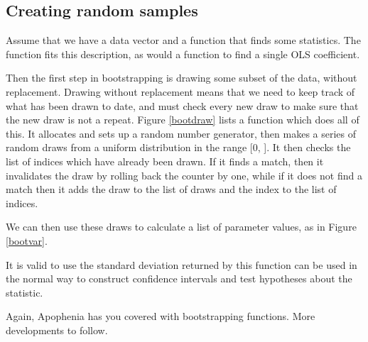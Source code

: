 \subsection{Creating random samples} Assume that we have a
data vector  and a function  that finds some statistics. The
function  fits this description, as would a function to find
a single OLS coefficient.

Then the first step in bootstrapping is drawing some subset of the data,
without replacement. Drawing without replacement means that we need to
keep track of what has been drawn to date, and must check every new draw
to make sure that the new draw is not a repeat. Figure \ref{bootdraw} lists a function which
does all of this. It allocates and sets up a random number generator, then
makes a series of random draws from a uniform distribution in the range
[0, ]. It then checks the list of indices which have
already been drawn. If it finds a match, then it invalidates the draw
by rolling back the counter by one, while if it does not find a match then it
adds the draw to the list of draws and the index to the list of indices.


We can then use these draws to calculate a list of parameter values, as in Figure \ref{bootvar}.

It is valid to use the standard deviation returned by this function can
be used in the normal way to construct confidence intervals and test
hypotheses about the statistic.

Again, Apophenia has you covered with bootstrapping functions. More developments to follow.
